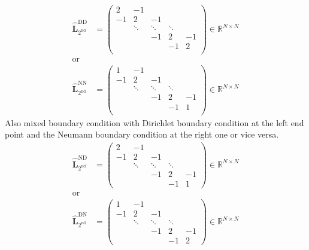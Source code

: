 \begin{align}\label{eq:second_derivative_penalty_plus_DrichletNeumann}
   \hat{\mathbf{L}}_\mathrm{2^{nd}}^\mathrm{DD} &=
  \begin{pmatrix}
    2   & -1     &        &        &    \\
    -1  & 2      & -1     &        &    \\
        & \ddots & \ddots & \ddots &    \\
        &        &  -1    & 2      & -1 \\
        &        &        & -1     & 2  \\
  \end{pmatrix}  \in \mathbb{R}^{N\times N}\\
  \mbox{or}  \nonumber \\
  \hat{\mathbf{L}}_\mathrm{2^{nd}}^\mathrm{NN}  &=
  \begin{pmatrix}
     1  & -1     &        &        &  \\
    -1  & 2      & -1     &        &  \\
        & \ddots & \ddots & \ddots &  \\
        &        & -1     &  2     & -1 \\
        &        &        & -1     & 1  \\
  \end{pmatrix} \in \mathbb{R}^{N\times N}
\end{align}
Also mixed boundary condition with Dirichlet boundary condition at the left end point and the Neumann boundary condition at the
right one or  vice versa.
\begin{align}\label{eq:second_derivative_penalty_plus_mixedDrichletNeumann}
  \hat{\mathbf{L}}_\mathrm{2^{nd}}^\mathrm{ND}  &=
  \begin{pmatrix}
    2   & -1     &        &        &    \\
    -1  & 2      & -1     &        &    \\
        & \ddots & \ddots & \ddots &    \\
        &        & -1     &  2     & -1 \\
        &        &        & -1     &  1
  \end{pmatrix} \in \mathbb{R}^{N\times N} \\
  \mbox{or}  \nonumber\\
   \hat{\mathbf{L}}_\mathrm{2^{nd}}^\mathrm{DN} &=
  \begin{pmatrix}
     1  & -1     &        &        &    \\
    -1  & 2      &  -1    &        &    \\
        & \ddots & \ddots & \ddots &    \\
        &        &  -1    &  2     & -1 \\
        &        &        & -1     & 2
  \end{pmatrix}  \in \mathbb{R}^{N\times N}
\end{align}

